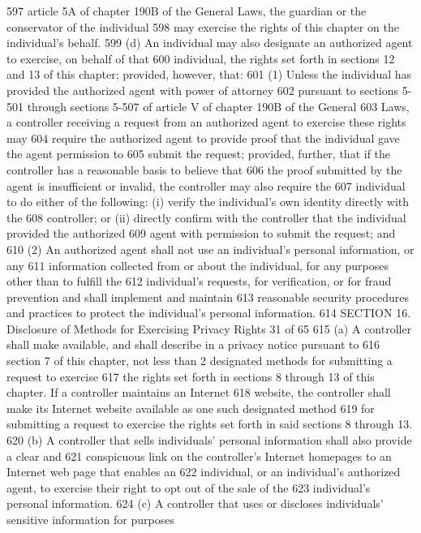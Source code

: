 597 article 5A of chapter 190B of the General Laws, the guardian or the conservator of the individual
598 may exercise the rights of this chapter on the individual’s behalf.
599 (d) An individual may also designate an authorized agent to exercise, on behalf of that
600 individual, the rights set forth in sections 12 and 13 of this chapter; provided, however, that:
601 (1) Unless the individual has provided the authorized agent with power of attorney
602 pursuant to sections 5-501 through sections 5-507 of article V of chapter 190B of the General
603 Laws, a controller receiving a request from an authorized agent to exercise these rights may
604 require the authorized agent to provide proof that the individual gave the agent permission to
605 submit the request; provided, further, that if the controller has a reasonable basis to believe that
606 the proof submitted by the agent is insufficient or invalid, the controller may also require the
607 individual to do either of the following: (i) verify the individual’s own identity directly with the
608 controller; or (ii) directly confirm with the controller that the individual provided the authorized
609 agent with permission to submit the request; and
610 (2) An authorized agent shall not use an individual’s personal information, or any
611 information collected from or about the individual, for any purposes other than to fulfill the
612 individual’s requests, for verification, or for fraud prevention and shall implement and maintain
613 reasonable security procedures and practices to protect the individual’s personal information.
614 SECTION 16. Disclosure of Methods for Exercising Privacy Rights
31 of 65
615 (a) A controller shall make available, and shall describe in a privacy notice pursuant to
616 section 7 of this chapter, not less than 2 designated methods for submitting a request to exercise
617 the rights set forth in sections 8 through 13 of this chapter. If a controller maintains an Internet
618 website, the controller shall make its Internet website available as one such designated method
619 for submitting a request to exercise the rights set forth in said sections 8 through 13.
620 (b) A controller that sells individuals’ personal information shall also provide a clear and
621 conspicuous link on the controller’s Internet homepages to an Internet web page that enables an
622 individual, or an individual’s authorized agent, to exercise their right to opt out of the sale of the
623 individual’s personal information.
624 (c) A controller that uses or discloses individuals’ sensitive information for purposes
